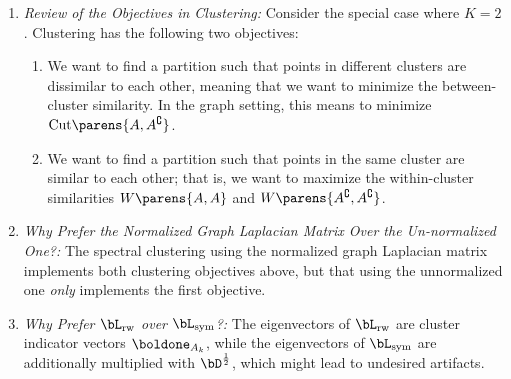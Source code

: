 \documentclass[12pt]{article}
\begin{document}
\begin{enumerate}[label=\textbf{\arabic*.}]
\begin{enumerate}
		\item \textit{Review of the Objectives in Clustering:} Consider the special case where $K = 2$. Clustering has the following two objectives: 
		\begin{enumerate}
			\item We want to find a partition such that points in different clusters are dissimilar to each other, meaning that we want to minimize the between-cluster similarity. In the graph setting, this means to minimize $\mathrm{Cut} \parens{A, A^{\complement}}$. 
			\item We want to find a partition such that points in the same cluster are similar to each other; that is, we want to maximize the within-cluster similarities $W \parens{A, A}$ and $W \parens{A^{\complement}, A^{\complement}}$. 
		\end{enumerate}
		
		\item \textit{Why Prefer the Normalized Graph Laplacian Matrix Over the Un-normalized One?:} The spectral clustering using the normalized graph Laplacian matrix implements both clustering objectives above, but that using the unnormalized one \emph{only} implements the first objective. 
		
		\item \textit{Why Prefer $\bL_{\mathrm{rw}}$ over $\bL_{\mathrm{sym}}$?:} The eigenvectors of $\bL_{\mathrm{rw}}$ are cluster indicator vectors $\boldone_{A_{k}}$, while the eigenvectors of $\bL_{\mathrm{sym}}$ are additionally multiplied with $\bD^{\frac{1}{2}}$, which might lead to undesired artifacts. 
		
	\end{enumerate}
	
\end{enumerate}

\printbibliography
\end{document}
